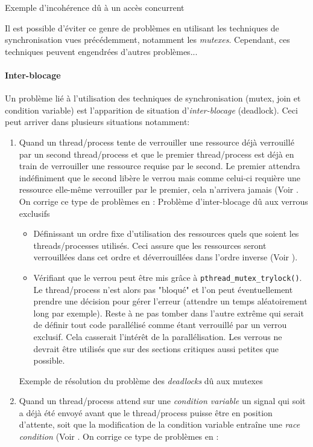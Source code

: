 \documentclass[a4paper, 12pt]{article}
\begin{document}
{Exemple d'incohérence dû à un accès concurrent}

Il est possible d'éviter ce genre de problèmes en utilisant les techniques de synchronisation vues précédemment, notamment les \emph{mutexes}. Cependant, ces techniques peuvent engendrées d'autres problèmes...

\paragraph{Inter-blocage\\}

Un problème lié à l'utilisation des techniques de synchronisation (mutex, join et condition variable) est l'apparition de situation d'\emph{inter-blocage} (deadlock). Ceci peut arriver dans plusieurs situations notamment:
\begin{enumerate}
    \item Quand un thread/process tente de verrouiller une ressource déjà verrouillé par un second thread/process et que le premier thread/process est déjà en train de verrouiller une ressource requise par le second. Le premier attendra indéfiniment que le second libère le verrou mais comme celui-ci requière une ressource elle-même verrouiller par le premier, cela n'arrivera jamais (Voir . On corrige ce type de problèmes en :
    {Problème d'inter-blocage dû aux verrous exclusifs}
    \begin{itemize}
        \item Définissant un ordre fixe d'utilisation des ressources quels que soient les threads/processes utilisés. Ceci assure que les ressources seront verrouillées dans cet ordre et déverrouillées dans l'ordre inverse (Voir ).
        \item Vérifiant que le verrou peut être mis grâce à \verb?pthread_mutex_trylock()?. Le thread/process n'est alors pas "bloqué" et l'on peut éventuellement prendre une décision pour gérer l'erreur (attendre un temps aléatoirement long par exemple). Reste à ne pas tomber dans l'autre extrême qui serait de définir tout code parallélisé comme étant verrouillé par un verrou exclusif. Cela casserait l'intérêt de la parallélisation. Les verrous ne devrait être utilisés que sur des sections critiques aussi petites que possible.
    \end{itemize}
    {Exemple de résolution du problème des \emph{deadlocks} dû aux mutexes}
    \item Quand un thread/process attend sur une \emph{condition variable} un signal qui soit a déjà été envoyé avant que le thread/process puisse être en position d'attente, soit que la modification de la condition variable entraîne une \emph{race condition} (Voir . On corrige ce type de problèmes en :

\end{enumerate}
\end{document}
